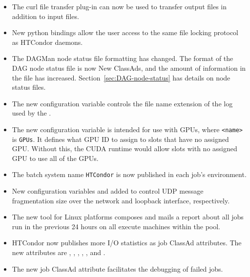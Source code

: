 \begin{itemize}
\item The curl file transfer plug-in can now be used to transfer output
files in addition to input files.

\item New python bindings allow the user access to the same 
file locking protocol as HTCondor daemons.

\item The DAGMan node status file formatting has changed.
The format of the DAG node status file is now New ClassAds,
and the amount of information in the file has increased.
Section~\ref{sec:DAG-node-status} has details on node status files.

\item The new configuration variable 
controls the file name extension of the log used by the .

\item The new configuration variable
is intended for use with GPUs, where \texttt{<name>} is \texttt{GPUs}. 
It defines what GPU ID to assign to slots that have no assigned GPU.
Without this, the CUDA runtime would allow slots with no assigned GPU to use
all of the GPUs.

\item The batch system name \texttt{HTCondor} is now published in 
each job's environment.

\item New configuration variables  and
	 added to control UDP message
	fragmentation size over the network and loopback interface, 
	respectively.

\item The new  tool for Linux platforms
composes and mails a report about all jobs run in the previous
24 hours on all execute machines within the pool. 

\item HTCondor now publishes more I/O statistics as job ClassAd attributes.
The new attributes are
,
,
,
,
, and
.

\item The new job ClassAd attribute  facilitates
the debugging of failed jobs.

\end{itemize}

